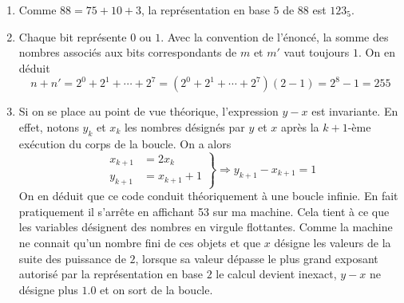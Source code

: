 \begin{enumerate}
  \item Comme $88 = 75 + 10 + 3$, la représentation en base $5$ de $88$ est $123_5$.
  \item Chaque bit représente $0$ ou $1$. Avec la convention de l'énoncé, la somme des nombres associés aux bits correspondants de $m$ et $m'$ vaut toujours $1$. On en déduit
 \begin{displaymath}
   n+n' =  2^0 + 2^1+\cdots + 2^7 = (2^0 + 2^1+\cdots + 2^7)(2-1)=2^8 - 1 =255 
 \end{displaymath}

  \item Si on se place au point de vue théorique, l'expression $y-x$ est invariante. En effet, notons $y_k$ et $x_k$ les nombres désignés par $y$ et $x$ après la $k+1$-ème exécution du corps de la boucle. On a alors
\begin{displaymath}
\left. 
\begin{aligned}
x_{k+1} &= 2x_k\\ y_{k+1} &= x_{k+1} +1  
\end{aligned}
\right\rbrace  \Rightarrow
y_{k+1}-x_{k+1} =  1
\end{displaymath}
On en déduit que ce code conduit théoriquement à une boucle infinie. En fait pratiquement il s'arrête en affichant 53 sur ma machine. Cela tient à ce que les variables désignent des nombres en virgule flottantes. Comme la machine ne connait qu'un nombre fini de ces objets et que $x$ désigne les valeurs de la suite des puissance de $2$, lorsque sa valeur dépasse le plus grand exposant autorisé par la représentation en base $2$ le calcul devient inexact, $y-x$ ne désigne plus $1.0$ et on sort de la boucle.
\end{enumerate}
